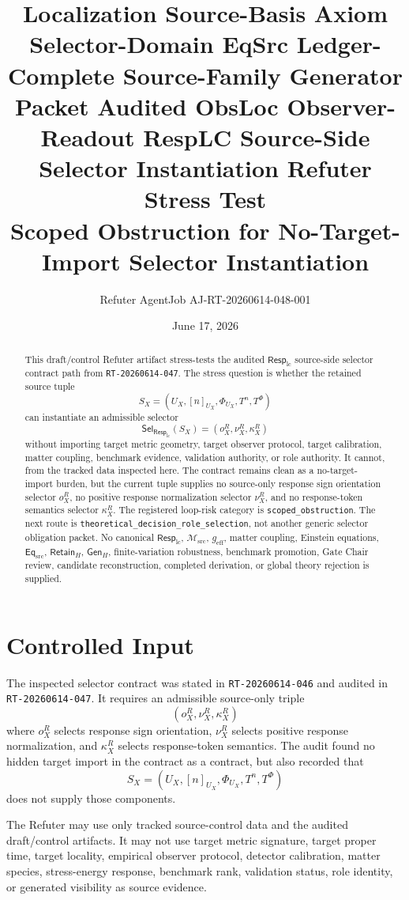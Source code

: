 \documentclass[11pt]{article}
\title{\textbf{Localization Source-Basis Axiom Selector-Domain EqSrc Ledger-Complete Source-Family Generator Packet Audited ObsLoc Observer-Readout RespLC Source-Side Selector Instantiation Refuter Stress Test}\\[0.35em]
\large Scoped Obstruction for No-Target-Import Selector Instantiation}
\author{Refuter AgentJob AJ-RT-20260614-048-001}
\date{June 17, 2026}
\newcommand{\EqSrc}{\mathsf{Eq}_{\mathrm{src}}}
\newcommand{\RetainH}{\mathsf{Retain}_{H}}
\newcommand{\GenH}{\mathsf{Gen}_{H}}
\newcommand{\Msrc}{\mathcal{M}_{\mathrm{src}}}
\newcommand{\RespLC}{\mathsf{Resp}_{\mathrm{lc}}}
\newcommand{\SelResp}{\mathsf{Sel}_{\RespLC}}
\newcommand{\geff}{g_{\mathrm{eff}}}
\begin{document}
\maketitle

\begin{abstract}
This draft/control Refuter artifact stress-tests the audited
\(\RespLC\) source-side selector contract path from
\texttt{RT-20260614-047}. The stress question is whether the retained
source tuple
\[
    S_X=(U_X,[n]_{U_X},\Phi_{U_X},T^n,T^\Phi)
\]
can instantiate an admissible selector
\[
    \SelResp(S_X)=(o^R_X,\nu^R_X,\kappa^R_X)
\]
without importing target metric geometry, target observer protocol,
target calibration, matter coupling, benchmark evidence, validation
authority, or role authority. It cannot, from the tracked data
inspected here. The contract remains clean as a no-target-import
burden, but the current tuple supplies no source-only response sign
orientation selector \(o^R_X\), no positive response normalization
selector \(\nu^R_X\), and no response-token semantics selector
\(\kappa^R_X\). The registered loop-risk category is
\texttt{scoped\_obstruction}. The next route is
\texttt{theoretical\_decision\_role\_selection}, not another generic
selector obligation packet. No canonical \(\RespLC\), \(\Msrc\),
\(\geff\), matter coupling, Einstein equations, \(\EqSrc\),
\(\RetainH\), \(\GenH\), finite-variation robustness, benchmark
promotion, Gate Chair review, candidate reconstruction, completed
derivation, or global theory rejection is supplied.
\end{abstract}

\section{Controlled Input}

The inspected selector contract was stated in
\texttt{RT-20260614-046} and audited in \texttt{RT-20260614-047}. It
requires an admissible source-only triple
\[
    (o^R_X,\nu^R_X,\kappa^R_X)
\]
where \(o^R_X\) selects response sign orientation, \(\nu^R_X\) selects
positive response normalization, and \(\kappa^R_X\) selects
response-token semantics. The audit found no hidden target import in
the contract as a contract, but also recorded that
\[
    S_X=(U_X,[n]_{U_X},\Phi_{U_X},T^n,T^\Phi)
\]
does not supply those components.

The Refuter may use only tracked source-control data and the audited
draft/control artifacts. It may not use target metric signature,
target proper time, target locality, empirical observer protocol,
detector calibration, matter species, stress-energy response,
benchmark rank, validation status, role identity, or generated
visibility as source evidence.
\end{document}
